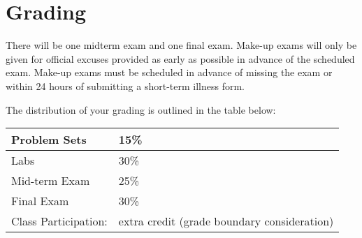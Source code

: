 \section{Grading}
There will be one midterm exam and one final exam. Make-up exams will only be
given for official excuses provided as early as possible in advance of the
scheduled exam. Make-up exams must be
scheduled in advance of missing the exam or within 24 hours of submitting a
short-term illness form.

The distribution of your grading is outlined in the table below:

\begin{center}
    \begin{tabular}{|l|l|} \hline
        Problem Sets  & 15\% \\ \hline
        Labs & 30\% \\ \hline
        Mid-term  Exam  & 25\% \\ \hline
        Final Exam & 30\% \\ \hline
        Class Participation:&extra credit (grade boundary consideration) \\ \hline
\end{tabular}
\end{center}

